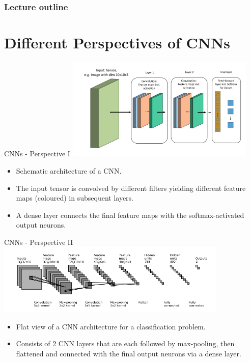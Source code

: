 
    








\begin{frame}
\frametitle{Lecture outline}
\tableofcontents
\end{frame}
    \section{Different Perspectives of CNNs}
    \begin{vbframe}{CNNs - Perspective I}
\center
\includegraphics[width=9cm]{plots/03_first_glimpse/cnn_scheme.png}
\begin{itemize}
\item Schematic architecture of a CNN.
\item The input tensor is convolved by different filters yielding different feature maps (coloured) in subsequent layers.
\item A dense layer connects the final feature maps with the softmax-activated output neurons.
\end{itemize}
\end{vbframe}

\begin{vbframe}{CNNs - Perspective II}
\center
\includegraphics[width=11cm]{plots/03_first_glimpse/cnn_flat.png}
\begin{itemize}
\item Flat view of a CNN architecture for a classification problem.
\item Consists of 2 CNN layers that are each followed by max-pooling, then flattened and connected with the final output neurons via a dense layer.
\end{itemize}
\end{vbframe}

